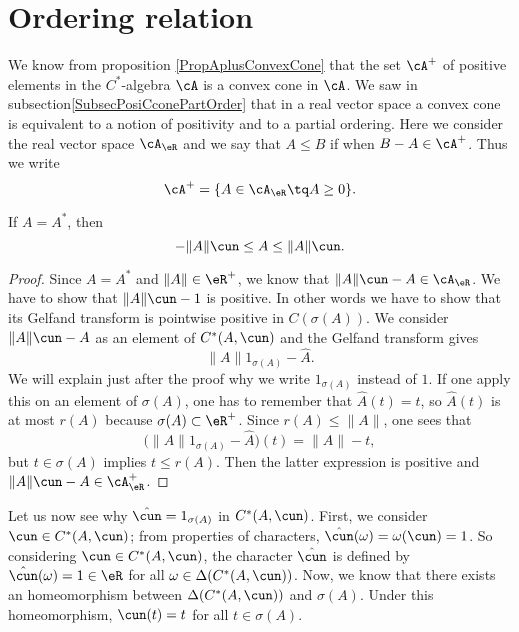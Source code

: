 
\section{Ordering relation}

We know from proposition \ref{PropAplusConvexCone} that the set \(\cA^+\) of positive elements in the $C^*$-algebra \(\cA\) is a convex cone in \(\cA\). We saw in subsection\ref{SubsecPosiCconePartOrder} that in a real vector space a convex cone is equivalent to a notion of positivity and to a partial ordering. Here we consider the real vector space \(\cA_{\eR}\) and we say that $A\leq B$ if when $B-A\in\cA^+$. Thus we write
\begin{equation}
    \cA^+=\{ A\in\cA_{\eR}\tq  A\geq 0\}.
\end{equation}


\begin{proposition}     \label{PropAAsmAuAAu}
If $A=A^*$, then
\[ 
  -\| A \|\cun\leq A\leq\| A \|\cun.
\]
\end{proposition}

\begin{proof}
Since $A=A^*$ and $\| A \|\in\eR^+$, we know that $\| A \|\cun-A\in\cA_{\eR}$. We have to show that $\| A \|\cun-1$ is positive. In other words we have to show that its Gelfand transform is pointwise positive in $C(\sigma(A))$. We consider $\| A \|\cun-A$ as an element of $C^*(A,\cun)$ and the Gelfand transform gives
\[ 
  \| A \|1_{\sigma(A)}-\hat A.
\]
We will explain just after the proof why we write $1_{\sigma(A)}$ instead of $1$. If one apply this on an element of $\sigma(A)$, one has to remember that $\hat A(t)=t$, so $\hat A(t)$ is at most $r(A)$ because $\sigma(A)\subset\eR^+$. Since $r(A)\leq\| A \|$, one sees that
\begin{equation}
    \big( \| A \|1_{\sigma(A)}-\hat A \big)(t)=\| A \|-t,
\end{equation}
but $t\in\sigma(A)$ implies $t\leq r(A)$. Then the latter expression is positive and $\| A \|\cun-A\in\cA_{\eR}^+$.

\end{proof}

Let us now see why $\hat \cun=1_{\sigma(A)}$ in $C^*(A,\cun)$. First, we consider $\cun\in C^*(A,\cun)$; from properties of characters, $\hat\cun(\omega)=\omega(\cun)=1$. So considering $\cun\in C^*(A,\cun)$, the character $\hat\cun$ is defined by $\hat\cun(\omega)=1\in\eR$ for all $\omega\in\Delta(C^*(A,\cun))$. Now, we know that there exists an homeomorphism between $\Delta(C^*(A,\cun))$ and $\sigma(A)$. Under this homeomorphism, $\cun(t)=t$ for all $t\in\sigma(A)$.

